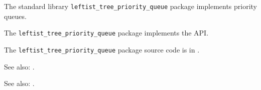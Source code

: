 

The standard library {\tt leftist\_tree\_priority\_queue} package implements priority queues.

The {\tt leftist\_tree\_priority\_queue} package implements the  API.

The {\tt leftist\_tree\_priority\_queue} package source code is in .

See also:  .

See also:  .



